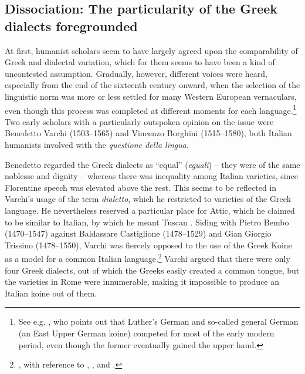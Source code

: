 \subsection{Dissociation: The particularity of the Greek dialects foregrounded}\label{sec:8.1.3}

At first, humanist scholars seem to have largely agreed upon the comparability of Greek and  dialectal variation, which for them seems to have been a kind of uncontested assumption. Gradually, however, different voices were heard, especially from the end of the sixteenth century onward, when the selection of the linguistic norm was more or less settled for many Western European vernaculars, even though this process was completed at different moments for each language.\footnote{See e.g. \citet[217--222]{Mattheier2003}, who points out that Luther’s German and so-called general German (an East Upper German koine) competed for most of the early modern period, even though the former eventually gained the upper hand.} Two early scholars with a particularly outspoken opinion on the issue were Benedetto Varchi (1503–1565) and Vincenzo Borghini (1515–1580), both Italian humanists involved with the \textit{questione della lingua}.

Benedetto \citet[95]{Varchi1570} regarded the Greek dialects as “equal” (\textit{eguali}) – they were of the same noblesse and dignity – whereas there was inequality among Italian varieties, since Florentine speech was elevated above the rest. This seems to be reflected in Varchi’s usage of the term \textit{dialetto}, which he restricted to varieties of the Greek language. He nevertheless reserved a particular place for Attic, which he claimed to be similar to Italian, by which he meant Tuscan \citep[141]{Varchi1570}. Siding with Pietro Bembo (1470–1547) against Baldassare Castiglione (1478–1529) and Gian Giorgio Trissino (1478–1550), Varchi was fiercely opposed to the use of the Greek Koine as a model for a common Italian language.\footnote{\citet[269--271]{Varchi1570}, with reference to \citet{Bembo1525}, \citet{Castiglione1528}, and \citet{Trissino1529}.} Varchi argued that there were only four Greek dialects, out of which the Greeks easily created a common tongue, but the varieties in Rome were innumerable, making it impossible to produce an Italian koine out of them.

